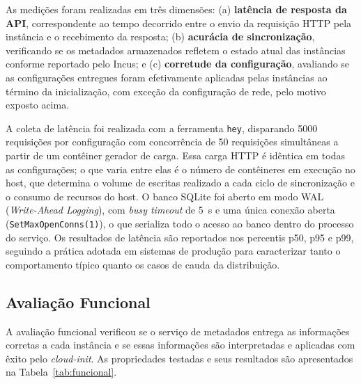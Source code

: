 As medições foram realizadas em três dimensões: (a) \textbf{latência de resposta da API}, correspondente ao tempo decorrido entre o envio da requisição HTTP pela instância e o recebimento da resposta; (b) \textbf{acurácia de sincronização}, verificando se os metadados armazenados refletem o estado atual das instâncias conforme reportado pelo Incus; e (c) \textbf{corretude da configuração}, avaliando se as configurações entregues foram efetivamente aplicadas pelas instâncias ao término da inicialização, com exceção da configuração de rede, pelo motivo exposto acima.

A coleta de latência foi realizada com a ferramenta \texttt{hey}, disparando 5000 requisições por configuração com concorrência de 50 requisições simultâneas a partir de um contêiner gerador de carga. Essa carga HTTP é idêntica em todas as configurações; o que varia entre elas é o número de contêineres em execução no host, que determina o volume de escritas realizado a cada ciclo de sincronização e o consumo de recursos do host. O banco SQLite foi aberto em modo WAL (\textit{Write-Ahead Logging}), com \textit{busy timeout} de 5~s e uma única conexão aberta (\texttt{SetMaxOpenConns(1)}), o que serializa todo o acesso ao banco dentro do processo do serviço. Os resultados de latência são reportados nos percentis p50, p95 e p99, seguindo a prática adotada em sistemas de produção para caracterizar tanto o comportamento típico quanto os casos de cauda da distribuição.

\subsection{Avaliação Funcional}
\label{subsec_avaliacao_funcional}

A avaliação funcional verificou se o serviço de metadados entrega as informações corretas a cada instância e se essas informações são interpretadas e aplicadas com êxito pelo \textit{cloud-init}. As propriedades testadas e seus resultados são apresentados na Tabela~\ref{tab:funcional}.


